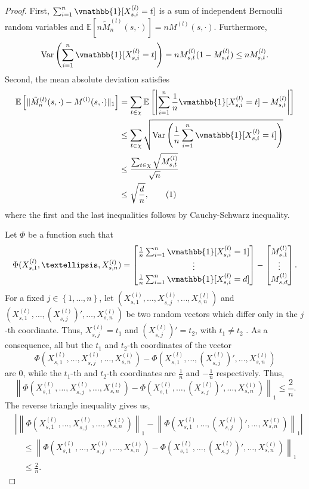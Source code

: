\documentclass[opre,sglanonrev]{informs4}
\numberwithin{equation}{section}
\newcommand{\pow}[1]{^{(#1)}}
\newcommand{\lp}{\left(}
\newcommand{\rp}{\right)}
\newcommand{\lc}{\left\{}
\newcommand{\rc}{\right\}}
\newcommand{\lb}{\left[}
\newcommand{\rb}{\right]}
\newcommand{\lv}{\left|}
\newcommand{\rv}{\right|}
\newcommand{\lV}{\left\|}
\newcommand{\rV}{\right\|}
\newcommand{\Var}{\mathrm{Var}}
\newcommand{\mls}{{M}^{(l)}(s,\cdot)}
\newcommand\numberthis{\addtocounter{equation}{1}\tag{\theequation}}
\newcommand{\expec}{\mathbb{E}}
\newcommand{\indicator}{\vmathbb{1}}
\begin{document}
\begin{APPENDICES}
\begin{proof}
First,  $\sum_{i=1}^n \indicator [X_{s,i}^{(l)}=t]$ is a sum of independent Bernoulli random variables and $\expec[n\tilde M_n\pow{l}(s,
    \cdot)]=n \mls$. 
Furthermore, 
\[
\Var\left( \sum_{i=1}^n \indicator [X_{s,i}^{(l)}=t]\right)=n {M}_{s,t}^{(l)}(1-{M}_{s,t}^{(l)})\leq n{M}_{s,t}^{(l)}.
\]
Second, the mean absolute deviation satisfies
\begin{align*}
    \expec\left[\lVert\tilde M_n\pow{l}(s,
    \cdot)-{M}\pow{l}(s,\cdot)\rVert_{1}\right] & = \sum_{t\in\chi}\expec\lb \lv\sum_{i=1}^n \frac{1}{n}\indicator [X_{s,i}^{(l)}=t]-{M}_{s,t}^{(l)}\rv \rb\\
    & \leq\sum_{t\in\chi}\sqrt{ \Var\lp\frac{1}{n}\sum_{i=1}^n\indicator [X_{s,i}^{(l)}=t]\rp}\\
    & \leq \frac{ \sum_{t\in\chi}\sqrt{M_{s,t}^{(l)}}}{\sqrt{n}}\\
    & \leq \sqrt{\frac{d}{n}},\numberthis\label{eq:main-thmeq6}
\end{align*}
where the first and the last inequalities follows by Cauchy-Schwarz inequality.

Let $\Phi$ be a function such that
\[
 \Phi(X_{s,1}\pow{l},\dots,X_{s,n}\pow{l})=\begin{bmatrix}
 \frac{1}{n}\sum_{i=1}^n\indicator[X_{s,i}\pow{l}=1]\\
 \vdots\\
 \frac{1}{n}\sum_{i=1}^n\indicator[X_{s,i}\pow{l}=d]
 \end{bmatrix}-\begin{bmatrix}
 M_{s,1}\pow{l}\\
 \vdots\\
 M_{s,d}\pow{l}
 \end{bmatrix}.
\]
For a fixed $j\in\lc1,\dots,n\rc$, let  $(X_{s,1}\pow{l},\dots,X_{s,j}\pow{l},\dots,X_{s,n}\pow{l})$ and $(X_{s,1}\pow{l},\dots,\lp X_{s,j}\pow{l}\rp',\dots,X_{s,n}\pow{l})$ be two random vectors which differ only in the $j$-th coordinate. 
Thus,
$X_{s,j}\pow{l}=t_1$ and $\lp X_{s,j}\pow{l}\rp'=t_2$, with $t_1\neq t_2$ .
As a consequence, all but the $t_1$ and $t_2$-th coordinates of the vector 
\[
\Phi(X_{s,1}\pow{l},\dots,X_{s,j}\pow{l},\dots,X_{s,n}\pow{l})-\Phi\lp X_{s,1}\pow{l},\dots,\lp X_{s,j}\pow{l}\rp',\dots,X_{s,n}\pow{l}\rp
\]
are $0$, while the $t_1$-th and $t_2$-th coordinates are $\frac{1}{n}$ and $-\frac{1}{n}$ respectively. Thus,
\[
\lV\Phi(X_{s,1}\pow{l},\dots,X_{s,j}\pow{l},\dots,X_{s,n}\pow{l})-\Phi\lp X_{s,1}\pow{l},\dots,\lp X_{s,j}\pow{l}\rp',\dots,X_{s,n}\pow{l}\rp\rV_{1}\leq \frac{2}{n}.
\]
The reverse triangle inequality gives us,
\begin{align*}
    & \lv\lV\Phi(X_{s,1}\pow{l},\dots,X_{s,j}\pow{l},\dots,X_{s,n}\pow{l})\rV_1 - \lV \Phi\lp X_{s,1}\pow{l},\dots,\lp X_{s,j}\pow{l}\rp',\dots,X_{s,n}\pow{l}\rp\rV_1\rv\\
    & \quad \leq\lV\Phi(X_{s,1}\pow{l},\dots,X_{s,j}\pow{l},\dots,X_{s,n}\pow{l})-\Phi\lp X_{s,1}\pow{l},\dots,\lp X_{s,j}\pow{l}\rp',\dots,X_{s,n}\pow{l}\rp\rV_1\\
    &\quad \leq \frac{2}{n}.
\end{align*}


\end{proof}
\end{APPENDICES}
\end{document}
